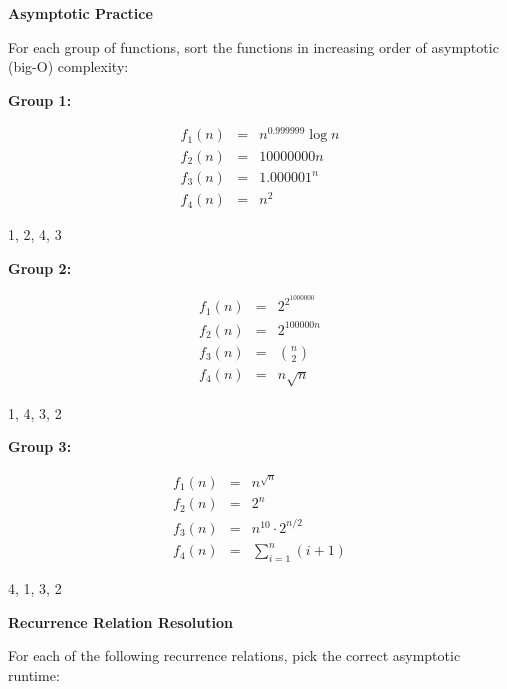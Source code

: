 \documentclass[12pt,twoside]{article}
\begin{document}
\begin{problems}

\problem {} \textbf{Asymptotic Practice}

For each group of functions, sort the functions in increasing order of
asymptotic (big-O) complexity:

\begin{problemparts}

\problempart {} \textbf{Group 1:}

$$
\begin{array}{rcl}
f_1(n) &=& n^{0.999999} \log n \\
f_2(n) &=& 10000000 n \\
f_3(n) &=& 1.000001^n \\
f_4(n) &=& n^2
\end{array}
$$

\ifsolution \solution{}
1, 2, 4, 3
\fi

\problempart {} \textbf{Group 2:}

$$
\begin{array}{rcl}
f_1(n) &=& 2^{2^{1000000}} \\
f_2(n) &=& 2^{100000n} \\
f_3(n) &=& \displaystyle \binom{n}{2} \\
f_4(n) &=& n \sqrt{n}
\end{array}
$$

\ifsolution \solution{}
1, 4, 3, 2
\fi

\problempart {} \textbf{Group 3:}

$$
\begin{array}{rcl}
f_1(n) &=& n^{\sqrt{n}} \\
f_2(n) &=& 2^n \\
f_3(n) &=& n^{10} \cdot 2^{n / 2} \\
f_4(n) &=& \displaystyle\sum_{i = 1}^{n} (i + 1)
\end{array}
$$

\ifsolution \solution{}
4, 1, 3, 2
\fi

\end{problemparts}

\problem {} \textbf{Recurrence Relation Resolution}

For each of the following recurrence relations,
pick the correct asymptotic runtime:


\end{problems}
\end{document}
